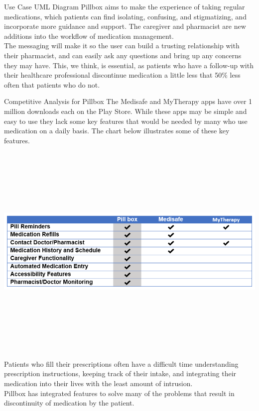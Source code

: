 \documentclass[22pt]{beamer}
\begin{document}
\begin{frame}[fragile]
\begin{textblock}{7.25}
\begin{block}{Use Case UML Diagram}
Pillbox aims to make the experience of taking regular medications, which patients can find isolating, confusing, and stigmatizing, and incorporate more guidance and support. The caregiver and pharmacist are new additions into the workflow of medication management. \\

The messaging will make it so the user can build a trusting relationship with their pharmacist, and can easily ask any questions and bring up any concerns they may have. This, we think, is essential, as patients who have a follow-up with their healthcare professional discontinue medication a little less that 50\% \cite{selmesmitchell2007} less often that patients who do not.

\end{block}

\begin{block}{Competitive Analysis for Pillbox}
The Medisafe and MyTherapy apps have over 1 million downloads each on the Play Store. While these apps may be simple and easy to use they lack some key features that would be needed by many who use medication on a daily basis. The chart below illustrates some of these key features.

\begin{center}
\includegraphics[height=10.5cm]{CompetitiveAdvantage.png}
\end{center}
Patients who fill their prescriptions often have a difficult time understanding prescription instructions, keeping track of their intake, and integrating their medication into their lives with the least amount of intrusion.\\
Pillbox has integrated features to solve many of the problems that result in discontinuity of medication by the patient.
\end{block}



\end{textblock}
\end{frame}
\end{document}
